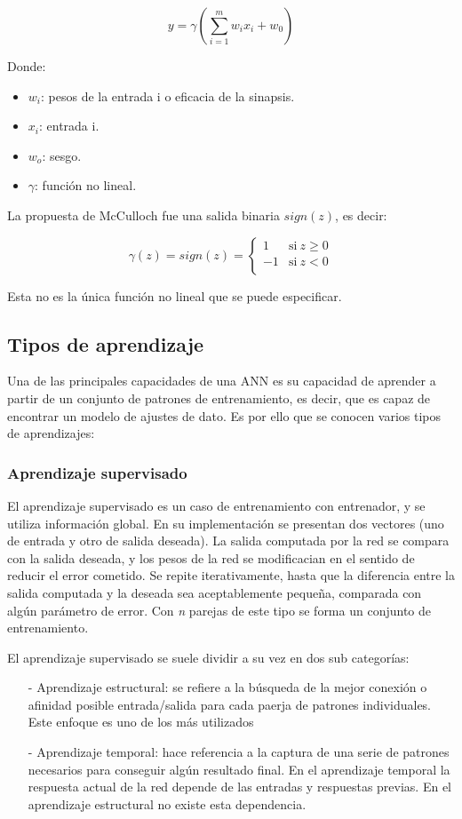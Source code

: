 $$ y = \gamma \left( \sum_{i = 1}^{m}w_ix_i + w_0 \right) $$

Donde:
\begin{itemize}
	\item $w_i$: pesos de la entrada i o eficacia de la sinapsis.
	\item $x_i$: entrada i.
	\item $w_o$: sesgo.
	\item $\gamma$: función no lineal.
\end{itemize}

La propuesta de McCulloch fue una salida binaria $sign(z)$, es decir:

$$ \gamma(z) = sign(z) = \left\{
	       \begin{array}{ll}
		 1      & \mathrm{si\ } z \ge 0 \\
		 -1	& \mathrm{si\ } z < 0  \\
	       \end{array}
	     \right. $$

Esta no es la única función no lineal que se puede especificar.

\subsection{Tipos de aprendizaje}

Una de las principales capacidades de una ANN es su capacidad de aprender a partir de un conjunto de patrones de entrenamiento, es decir, que es capaz
de encontrar un modelo de ajustes de dato. Es por ello que se conocen varios tipos de aprendizajes:

\subsubsection{Aprendizaje supervisado}

El aprendizaje supervisado es un caso de entrenamiento con entrenador, y se utiliza información global. En su implementación se presentan dos vectores (uno de entrada y otro de salida deseada).
La salida computada por la red se compara con la salida deseada, y los pesos de la red se modificacian en el sentido de reducir el error cometido. Se repite iterativamente, hasta que la diferencia
entre la salida computada y la deseada sea aceptablemente pequeña, comparada con algún parámetro de error. Con \emph{n} parejas de este tipo se forma un conjunto de entrenamiento.

El aprendizaje supervisado se suele dividir a su vez en dos sub categorías:
\begin{itemize}
	\item[-] Aprendizaje estructural: se refiere a la búsqueda de la mejor conexión o afinidad posible entrada/salida para cada paerja de patrones individuales. Este enfoque es uno de los más utilizados
	\item[-] Aprendizaje temporal: hace referencia a la captura de una serie de patrones necesarios para conseguir algún resultado final. En el aprendizaje temporal la respuesta actual de la red depende de las entradas
		y respuestas previas. En el aprendizaje estructural no existe esta dependencia.
\end{itemize}

